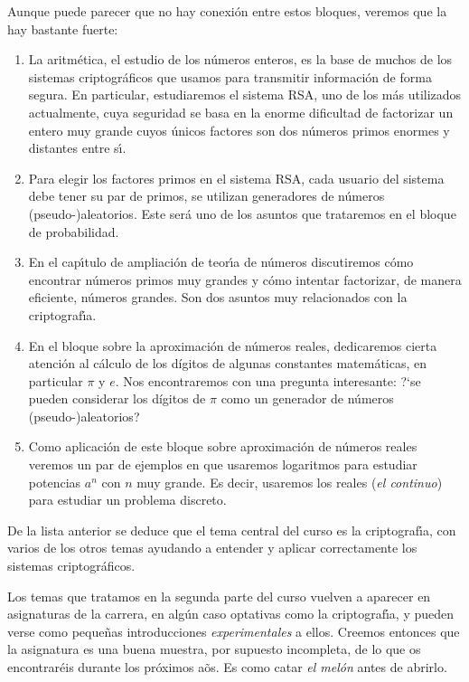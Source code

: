 Aunque puede parecer que no hay conexi\'on entre estos bloques, veremos que  la
hay bastante fuerte:
\begin{enumerate}
 \item La aritm\'etica, el estudio de los n\'umeros enteros, es la base de
muchos de los sistemas criptogr\'aficos que usamos para transmitir informaci\'on
de forma segura. En particular, estudiaremos el sistema RSA, uno de los m\'as
utilizados actualmente,  cuya seguridad se basa en la enorme dificultad de
factorizar un entero muy grande cuyos \'unicos factores son dos n\'umeros primos
enormes y distantes entre s\'{\i}. 
\item Para elegir los factores primos en el sistema RSA, cada usuario del
sistema debe tener su par de primos, se utilizan generadores de n\'umeros
(pseudo-)aleatorios.  Este ser\'a uno de los asuntos que trataremos en el bloque
de probabilidad. 
\item En el cap\'{\i}tulo de ampliaci\'on de teor\'{\i}a de n\'umeros discutiremos c\'omo encontrar n\'umeros primos muy grandes y c\'omo intentar factorizar, de manera eficiente, n\'umeros grandes. Son dos asuntos muy relacionados con la criptograf\'{\i}a.  
\item En el bloque sobre la aproximaci\'on de n\'umeros reales, dedicaremos
cierta atenci\'on al c\'alculo  de los d\'igitos de algunas constantes
matem\'aticas, en particular $\pi$ y $e$. 
Nos encontraremos con una pregunta interesante: ?`se pueden considerar los
d\'igitos de $\pi$ como un generador de n\'umeros (pseudo-)aleatorios?

\item Como aplicaci\'on de este bloque sobre aproximaci\'on de n\'umeros reales
veremos un par de ejemplos  en que usaremos logaritmos para estudiar potencias
$a^n$ con $n$ muy grande. Es decir, usaremos los reales ({\itshape el continuo}) para
estudiar un problema discreto. 
 \end{enumerate}


De la lista anterior se deduce que el tema central del curso es la
criptograf\'{\i}a,  con varios de los otros temas ayudando a entender y aplicar
correctamente los sistemas criptogr\'aficos.

Los temas que tratamos en la segunda parte del curso vuelven a aparecer en
asignaturas de la carrera, en alg\'un caso optativas como la criptograf\'{\i}a,
y pueden verse como peque\~nas introducciones {\itshape experimentales} a
ellos. Creemos entonces que la asignatura es una buena muestra, por supuesto
 incompleta,  de lo que os encontrar\'eis durante los pr\'oximos a\~os. Es como
catar {\itshape el mel\'on} antes de abrirlo.
 
